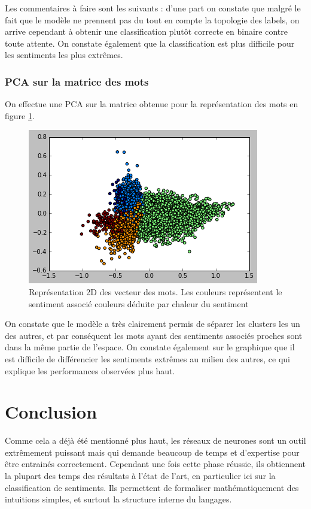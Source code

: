 \documentclass[conference]{IEEEtran}
\begin{document}
Les commentaires à faire sont les suivants : d'une part on constate que malgré le fait que le modèle ne prennent pas du tout en compte la topologie des labels, on arrive cependant à obtenir une classification plutôt correcte en binaire contre toute attente. On constate également que la classification est plus difficile pour les sentiments les plus extrêmes.



\subsubsection{PCA sur la matrice des mots}
On effectue une PCA sur la matrice obtenue pour la représentation des mots en figure \ref{wordPCA}.

\begin{figure}
\includegraphics[width=\columnwidth]{fig/WordPlot.png}
\caption{Représentation 2D des vecteur des mots. Les couleurs représentent le sentiment associé couleurs déduite par chaleur du sentiment}
\label{wordPCA}
\end{figure}

On constate que le modèle a très clairement permis de séparer les clusters les un des autres, et par conséquent les mots ayant des sentiments associés proches sont dans la même partie de l'espace. On constate également sur le graphique que il est difficile de différencier les sentiments extrêmes au milieu des autres, ce qui explique les performances observées plus haut.


\section{Conclusion}
Comme cela a déjà été mentionné plus haut, les réseaux de neurones sont un outil extrêmement puissant mais qui demande beaucoup de temps et d'expertise pour être entrainés correctement. Cependant une fois cette phase réussie, ils obtiennent la plupart des temps des résultats à l'état de l'art, en particulier ici sur la classification de sentiments. Ils permettent de formaliser mathématiquement des intuitions simples, et surtout la structure interne du langages.
\end{document}
